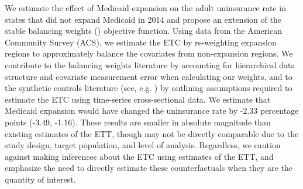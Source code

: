 We estimate the effect of Medicaid expansion on the adult uninsurance rate in states that did not expand Medicaid in 2014 and propose an extension of the stable balancing weights (\cite{zubizarreta2015stable}) objective function. Using data from the American Community Survey (ACS), we estimate the ETC by re-weighting expansion regions to approximately balance the covariates from non-expansion regions. We contribute to the balancing weights literature by accounting for hierarchical data structure and covariate measurement error when calculating our weights, and to the synthetic controls literature (see, e.g. \cite{abadie2010synthetic}) by outlining assumptions required to estimate the ETC using time-series cross-sectional data. We estimate that Medicaid expansion would have changed the uninsurance rate by -2.33 percentage points (-3.49, -1.16). These results are smaller in absolute magnitude than existing estimates of the ETT, though may not be directly comparable due to the study design, target population, and level of analysis. Regardless, we caution against making inferences about the ETC using estimates of the ETT, and emphasize the need to directly estimate these counterfactuals when they are the quantity of interest.

